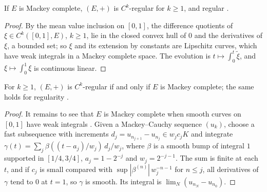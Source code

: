 \begin{proposition}
  \label{prop:vector-mackey}
  \leanok
  If $E$ is Mackey complete, $(E, +)$ is $C^k$-regular for $k \geq 1$, and regular
  \cite[Proposition 6.1.3]{GN26}.
\end{proposition}

\begin{proof}
  \leanok
  By the mean value inclusion on $[0, 1]$, the difference quotients of $\xi \in C^k([0, 1], E)$,
  $k \geq 1$, lie in the closed convex hull of $0$ and the derivatives of $\xi$, a bounded set; so
  $\xi$ and its extension by constants are Lipschitz curves, which have weak integrals in a Mackey
  complete space. The evolution is $t \mapsto \int_0^t \tilde\xi$, and
  $\xi \mapsto \int_0^1 \xi$ is continuous linear.
\end{proof}

\begin{theorem}
  \label{thm:mackey-regular}
  \leanok
  For $k \geq 1$, $(E, +)$ is $C^k$-regular if and only if $E$ is Mackey complete; the same holds
  for regularity \cite[Proposition 6.1.3]{GN26}.
\end{theorem}

\begin{proof}
  \leanok
  It remains to see that $E$ is Mackey complete when smooth curves on $[0, 1]$ have weak integrals
  \cite[Remark 1.1.18(c)]{GN26}. Given a Mackey--Cauchy sequence $(u_k)$, choose a fast subsequence
  with increments $d_j = u_{n_{j+1}} - u_{n_j} \in w_j c_j K$ and integrate
  $\gamma(t) = \sum_j \beta((t - a_j)/w_j)\, d_j/w_j$, where $\beta$ is a smooth bump of
  integral $1$ supported in $[1/4, 3/4]$, $a_j = 1 - 2^{-j}$ and $w_j = 2^{-j-1}$. The sum is
  finite at each $t$, and if $c_j$ is small compared with $\sup|\beta^{(n)}|\,w_j^{-n-1}$ for
  $n \leq j$, all derivatives of $\gamma$ tend to $0$ at $t = 1$, so $\gamma$ is smooth. Its
  integral is $\lim_N (u_{n_N} - u_{n_0})$.
\end{proof}

